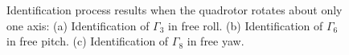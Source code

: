 \documentclass[3p,times]{elsarticle}
\begin{document}
\begin{figure}[H]
	\caption{Identification process results when the quadrotor rotates about only one axis: (a) Identification of $\Gamma_3$ in free roll. (b) Identification of $\Gamma_6$ in free pitch. (c) Identification of $\Gamma_8$
	in free yaw.}
	\label{fig:one_degree_identification}
\end{figure}
\end{document}
